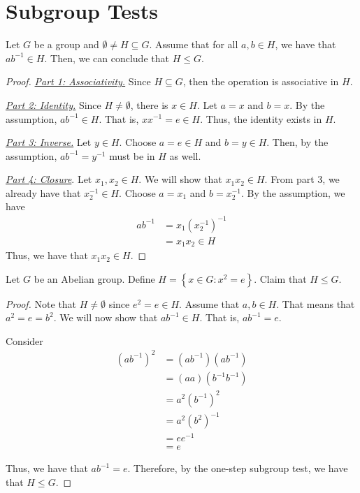 \section{Subgroup Tests}

\begin{theorem}
    Let \(G\) be a group and \(\emptyset \neq H \subseteq G\). Assume that for all \(a, b \in H\), we have that \(ab^{-1} \in H\). Then, we can conclude that \(H \leq G\).
\end{theorem}

\begin{proof}
    \phantom{Part 0}

    \underline{\textit{Part 1: Associativity.}} Since \(H \subseteq G\), then the operation is associative in \(H\). 

    \underline{\textit{Part 2: Identity.}} Since \(H \neq \emptyset\), there is \(x \in H\). Let \(a = x\) and \(b = x\). By the assumption, \(ab^{-1} \in H\). That is, \(xx^{-1} = e \in H\). Thus, the identity exists in \(H\).

    \underline{\textit{Part 3: Inverse.}} Let \(y \in H\). Choose \(a = e \in H\) and \(b = y \in H\). Then, by the assumption, \(ab^{-1} = y^{-1}\) must be in \(H\) as well.

    \underline{\textit{Part 4: Closure}}. Let \(x_1, x_2 \in H\). We will show that \(x_1x_2 \in H\). From part 3, we already have that \(x_2^{-1} \in H\). Choose \(a = x_1\) and \(b = x_2^{-1}\). By the assumption, we have
    \[
    \begin{aligned}
        ab^{-1} &= x_1(x_2^{-1})^{-1} \\
                &= x_1x_2 \in H
    \end{aligned}
    \]
    Thus, we have that \(x_1x_2 \in H\).
\end{proof}

\begin{nexample}
    Let \(G\) be an Abelian group. Define \(H = \left\{x \in G : x^2 = e\right\}\). Claim that \(H \leq G\).

    \begin{proof}
        Note that \(H \neq \emptyset\) since \(e^2 = e \in H\). Assume that \(a, b \in H\). That means that \(a^2 = e = b^2\). We will now show that \(ab^{-1} \in H\). That is, \(ab^{-1} = e\).

        Consider
        \[
        \begin{aligned}
            (ab^{-1})^2 &= (ab^{-1})(ab^{-1})  \\
                        &= (aa)(b^{-1}b^{-1}) \\
                        &= a^2(b^{-1})^2 \\
                        &= a^2(b^{2})^{-1} \\
                        &= ee^{-1} \\
                        &= e
        \end{aligned}
        \]

        Thus, we have that \(ab^{-1} = e\). Therefore, by the one-step subgroup test, we have that \(H \leq G\).
    \end{proof}
\end{nexample}

